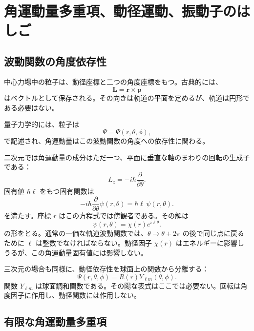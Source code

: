 \chapter{角運動量多重項、動径運動、振動子のはしご}

\section{波動関数の角度依存性}

中心力場中の粒子は、動径座標と二つの角度座標をもつ。古典的には、
\begin{equation}
\mathbf L=\mathbf r\times\mathbf p
\end{equation}
はベクトルとして保存される。その向きは軌道の平面を定めるが、軌道は円形である必要はない。

量子力学的には、粒子は
\begin{equation}
\Psi=\Psi(r,\theta,\phi),
\end{equation}
で記述され、角運動量はこの波動関数の角度への依存性に関わる。

二次元では角運動量の成分はただ一つ、平面に垂直な軸のまわりの回転の生成子である：
\begin{equation}
L_z=-i\hbar\frac{\partial}{\partial\theta}.
\end{equation}
固有値 \(\hbar\ell\) をもつ固有関数は
\begin{equation}
-i\hbar\frac{\partial}{\partial\theta}\psi(r,\theta)
=\hbar\ell\,\psi(r,\theta).
\end{equation}
を満たす。座標 \(r\) はこの方程式では傍観者である。その解は
\begin{equation}
\psi(r,\theta)=\chi(r)e^{i\ell\theta}.
\end{equation}
の形をとる。通常の一価な軌道波動関数では、\(\theta\to\theta+2\pi\) の後で同じ点に戻るために \(\ell\) は整数でなければならない。動径因子 \(\chi(r)\) はエネルギーに影響しうるが、この角運動量固有値には影響しない。

三次元の場合も同様に、動径依存性を球面上の関数から分離する：
\begin{equation}
\Psi(r,\theta,\phi)=R(r)Y_{\ell m}(\theta,\phi).
\end{equation}
関数 \(Y_{\ell m}\) は球面調和関数である。その陽な表式はここでは必要ない。回転は角度因子に作用し、動径関数には作用しない。

\section{有限な角運動量多重項}

